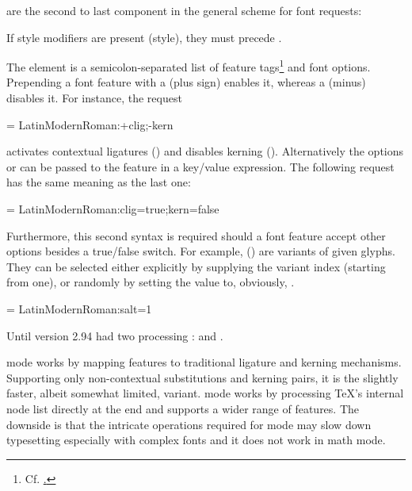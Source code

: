  are the second to last component in the
general scheme for font requests:

\beginnarrower
  \nonproportional{:}%
  \nonproportional{:}%
\endnarrower

\noindent
If style modifiers are present (\XETEX style), they must precede
.

The element  is a semicolon-separated list of feature
tags\footnote{%
  Cf. \hyperlink {http://www.microsoft.com/typography/otspec/featurelist.htm}.
}
and font options.
%
Prepending a font feature with a \inlinecode{+} (plus sign) enables it,
whereas a \inlinecode{-} (minus) disables it. For instance, the request

\beginlisting
  \font \test = LatinModernRoman:+clig;-kern
\endlisting

\noindent activates contextual ligatures () and
disables kerning ().
%
Alternatively the options  or  can
be passed to the feature in a key/value expression.
%
The following request has the same meaning as the last one:

\beginlisting
  \font \test = LatinModernRoman:clig=true;kern=false
\endlisting

\noindent
Furthermore, this second syntax is required should a font feature
accept other options besides a true/false switch.
%
For example,  () are
variants of given glyphs.
%
They can be selected either explicitly by supplying the variant
index (starting from one), or randomly by setting the value to,
obviously, .

\beginlisting
  \font \librmsaltfirst = LatinModernRoman:salt=1
\endlisting

\label{sec:mode}

\begindescriptions

         Until version 2.94
          had two \OpenType processing
         :
          and .

          mode works by mapping \OpenType
         features to traditional \TEX ligature and kerning mechanisms.
         Supporting only non-contextual substitutions and kerning
         pairs, it is the slightly faster, albeit somewhat limited, variant.
          mode works by processing \TeX’s internal
         node list directly at the \LUA end and supports
         a wider range of \OpenType features.
         The downside is that the intricate operations required for
          mode may slow down typesetting especially
         with complex fonts and it does not work in math mode.

